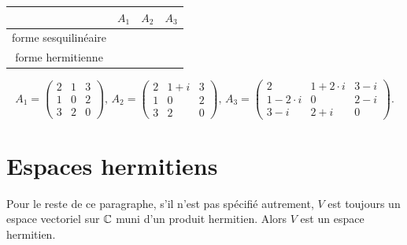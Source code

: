 \begin{enumerate}
\bigskip 

  \begin{center}
 
    \begin{tabular}{|c|c|c|c|}
      \hline 
      & $A_1$ & $A_2$ & $A_3$ \\\hline 
      forme sesquilinéaire & & & \\ \hline 
      forme hermitienne & & & \\ \hline 
    \end{tabular}
  \end{center}
  
  \medskip 


  \begin{displaymath}
    A_1 = 
    \begin{pmatrix}
      2 & 1 & 3 \\
      1 & 0 & 2 \\
      3 & 2 & 0
    \end{pmatrix}, \, 
    A_2 = 
 \begin{pmatrix}
      2 & 1+i & 3 \\
      1 & 0 & 2 \\
      3 & 2 & 0
    \end{pmatrix}, \, 
     A_3 = 
    \begin{pmatrix}
      2 & 1+ 2 \cdot i & 3 - i \\
      1 - 2 \cdot i & 0 & 2-i \\
      3-i & 2+i & 0
    \end{pmatrix}. 
  \end{displaymath}


  

\end{enumerate}





\section{Espaces hermitiens} 
\label{sec:espaces-hermitiens}



\begin{framed}\noindent 
  Pour le reste de ce paragraphe, s'il n'est pas spécifié autrement,  $V$
  est toujours un espace vectoriel sur $\mathbb{C}$
  muni d'un produit hermitien. Alors $V$ est un espace hermitien. 
\end{framed}




